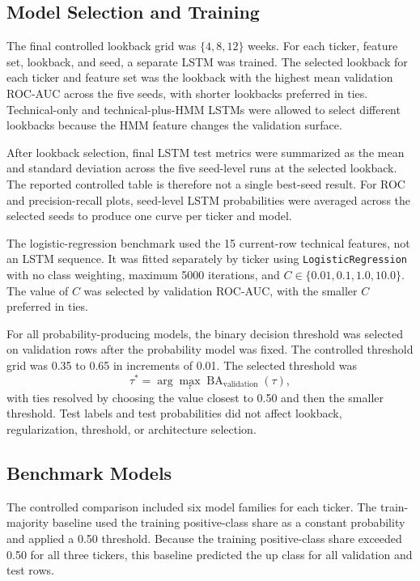 \subsection{Model Selection and Training}

The final controlled lookback grid was \(\{4,8,12\}\) weeks. For each ticker, feature set, lookback, and seed, a separate LSTM was trained. The selected lookback for each ticker and feature set was the lookback with the highest mean validation ROC-AUC across the five seeds, with shorter lookbacks preferred in ties. Technical-only and technical-plus-HMM LSTMs were allowed to select different lookbacks because the HMM feature changes the validation surface.

After lookback selection, final LSTM test metrics were summarized as the mean and standard deviation across the five seed-level runs at the selected lookback. The reported controlled table is therefore not a single best-seed result. For ROC and precision-recall plots, seed-level LSTM probabilities were averaged across the selected seeds to produce one curve per ticker and model.

The logistic-regression benchmark used the 15 current-row technical features, not an LSTM sequence. It was fitted separately by ticker using \texttt{LogisticRegression} with no class weighting, maximum 5000 iterations, and \(C\in\{0.01,0.1,1.0,10.0\}\). The value of \(C\) was selected by validation ROC-AUC, with the smaller \(C\) preferred in ties.

For all probability-producing models, the binary decision threshold was selected on validation rows after the probability model was fixed. The controlled threshold grid was 0.35 to 0.65 in increments of 0.01. The selected threshold was
\[
\tau^*=\arg\max_{\tau} \operatorname{BA}_{\mathrm{validation}}(\tau),
\]
with ties resolved by choosing the value closest to 0.50 and then the smaller threshold. Test labels and test probabilities did not affect lookback, regularization, threshold, or architecture selection.

\subsection{Benchmark Models}

The controlled comparison included six model families for each ticker. The train-majority baseline used the training positive-class share as a constant probability and applied a 0.50 threshold. Because the training positive-class share exceeded 0.50 for all three tickers, this baseline predicted the up class for all validation and test rows.


